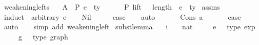\begin{isabellebody}
\isamarkupfalse%
\ weakening{\isacharunderscore}{\kern0pt}lefts{\isacharcolon}{\kern0pt}\isanewline
\ \ \ A{}{\isacharcolon}{\kern0pt}\ {\isachardoublequoteopen}{\isasymGamma}\ {\isasymturnstile}{\isacharbraceleft}{\kern0pt}P{\isacharbraceright}{\kern0pt}\ e\ {\isacharcolon}{\kern0pt}\ ty{\isachardoublequoteclose}\isanewline
\ \ \ {\isachardoublequoteopen}{\isasymGamma}{}\ {\isacharat}{\kern0pt}\ {\isasymGamma}\ {\isasymturnstile}{\isacharbraceleft}{\kern0pt}P{\isacharbraceright}{\kern0pt}\ {\isacharparenleft}{\kern0pt}lift\ {}\ {\isacharcircum}{\kern0pt}{\isacharcircum}{\kern0pt}\ length\ {\isasymGamma}{}{\isacharparenright}{\kern0pt}\ e\ {\isacharcolon}{\kern0pt}\ ty{\isachardoublequoteclose}\isanewline
%
\isadelimproof
%
\endisadelimproof
%
\isatagproof
{}\isamarkupfalse%
\ assms\isanewline
{}\isamarkupfalse%
\ {\isacharparenleft}{\kern0pt}induct\ {\isasymGamma}{}\ arbitrary{\isacharcolon}{\kern0pt}\ e{\isacharparenright}{\kern0pt}\isanewline
\ \ \isamarkupfalse%
\ Nil\isanewline
\ \ \isamarkupfalse%
\ \isamarkupfalse%
\ {\isacharquery}{\kern0pt}case\isanewline
\ \ \isamarkupfalse%
\ auto\isanewline
\ \ \isamarkupfalse%
\isanewline
{}\isamarkupfalse%
\isanewline
\ \ \isamarkupfalse%
\ {\isacharparenleft}{\kern0pt}Cons\ a\ {\isasymGamma}{}{\isacharparenright}{\kern0pt}\isanewline
\ \ \isamarkupfalse%
\ \isamarkupfalse%
\ {\isacharquery}{\kern0pt}case\isanewline
\ \ \isamarkupfalse%
\ auto\isanewline
\ \ \isamarkupfalse%
\ {\isacharparenleft}{\kern0pt}simp\ add{\isacharcolon}{\kern0pt}\ weakening{\isacharunderscore}{\kern0pt}left{\isacharparenright}{\kern0pt}\isanewline
{}\isamarkupfalse%
%
\endisatagproof
{\isafoldproof}%
%
\isadelimproof
\isanewline
%
\endisadelimproof
\isanewline
\isanewline
\isanewline
{}\isamarkupfalse%
\ subst{\isacharunderscore}{\kern0pt}lemma{\isacharcolon}{\kern0pt}\isanewline
\ \ \ i\ \ \ {\isacharcolon}{\kern0pt}{\isacharcolon}{\kern0pt}\ nat\isanewline
\ \ \ \ \ e{}\ \ {\isacharcolon}{\kern0pt}{\isacharcolon}{\kern0pt}\ {\isachardoublequoteopen}type\ exp{\isachardoublequoteclose}\isanewline
\ \ \ \ \ g{}\ \ {\isacharcolon}{\kern0pt}{\isacharcolon}{\kern0pt}\ {\isachardoublequoteopen}type\ graph{\isachardoublequoteclose}\isanewline

\end{isabellebody}
